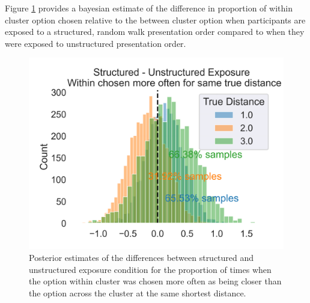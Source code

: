 Figure \ref{fig:exp3-bayesmodel_results} provides a bayesian estimate of the difference in proportion of within cluster option chosen relative to the between cluster option when participants are exposed to a structured, random walk presentation order compared to when they were exposed to unstructured presentation order. 


\begin{figure}
    \centering
    \includegraphics[width = \textwidth]{chapter_notebooks/chapter_3/figures/exp3_bayesmodel_results.png}
    \caption{Posterior estimates of the differences between structured and unstructured exposure condition for the proportion of times when the option within cluster was chosen more often as being closer than the option across the cluster at the same shortest distance.}
    \label{fig:exp3-bayesmodel_results}
\end{figure}

